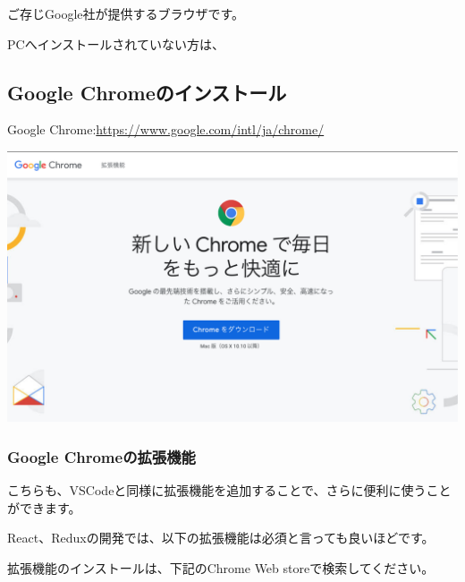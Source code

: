 ご存じGoogle社が提供するブラウザです。

PCへインストールされていない方は、\\[0pt]

\subsection{Google Chromeのインストール}
\keeplastskip{
  \label{sec:1-3-1}
  \par\nobreak
}

Google Chrome:\url{https://www.google.com/intl/ja/chrome/}

\begin{reviewimage}[H]%
\includegraphics[width=1.0\maxwidth]{./images/01-createDevEnv/01_09googleChrome.png}%
\label{image:01-createDevEnv:01_09googleChrome}
\end{reviewimage}

\subsubsection*{Google Chromeの拡張機能}
\keeplastskip{
  \label{sec:1-3-1-1}
  \par\nobreak
}

こちらも、VSCodeと同様に拡張機能を追加することで、さらに便利に使うことができます。

React、Reduxの開発では、以下の拡張機能は必須と言っても良いほどです。

\vspace*{\baselineskip}

拡張機能のインストールは、下記のChrome Web storeで検索してください。

\vspace*{\baselineskip}


